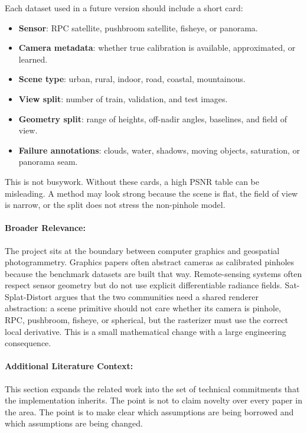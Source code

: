 \documentclass{article}
\begin{document}
Each dataset used in a future version should include a short card:
\begin{itemize}
  \item \textbf{Sensor}: RPC satellite, pushbroom satellite, fisheye, or panorama.
  \item \textbf{Camera metadata}: whether true calibration is available, approximated, or learned.
  \item \textbf{Scene type}: urban, rural, indoor, road, coastal, mountainous.
  \item \textbf{View split}: number of train, validation, and test images.
  \item \textbf{Geometry split}: range of heights, off-nadir angles, baselines, and field of view.
  \item \textbf{Failure annotations}: clouds, water, shadows, moving objects, saturation, or panorama seam.
\end{itemize}
This is not busywork. Without these cards, a high PSNR table can be misleading. A method may look strong because the scene is flat, the field of view is narrow, or the split does not stress the non-pinhole model.

\paragraph{Broader Relevance:}

The project sits at the boundary between computer graphics and geospatial photogrammetry. Graphics papers often abstract cameras as calibrated pinholes because the benchmark datasets are built that way. Remote-sensing systems often respect sensor geometry but do not use explicit differentiable radiance fields. Sat-Splat-Distort argues that the two communities need a shared renderer abstraction: a scene primitive should not care whether its camera is pinhole, RPC, pushbroom, fisheye, or spherical, but the rasterizer must use the correct local derivative. This is a small mathematical change with a large engineering consequence.

\paragraph{Additional Literature Context:}

This section expands the related work into the set of technical commitments that the implementation inherits. The point is not to claim novelty over every paper in the area. The point is to make clear which assumptions are being borrowed and which assumptions are being changed.
\end{document}
